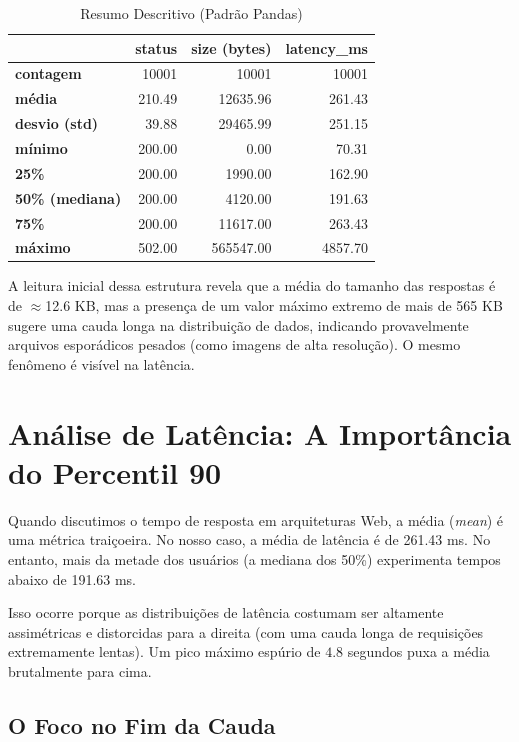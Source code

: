 \documentclass[12pt,a4paper]{report}
\begin{document}
\begin{table}[h]
\centering
\caption{Resumo Descritivo (Padrão Pandas)}
\begin{tabular}{lrrr}
\toprule
 & \textbf{status} & \textbf{size (bytes)} & \textbf{latency\_ms} \\
\midrule
\textbf{contagem} & 10001 & 10001 & 10001 \\
\textbf{média} & 210.49 & 12635.96 & 261.43 \\
\textbf{desvio (std)} & 39.88 & 29465.99 & 251.15 \\
\textbf{mínimo} & 200.00 & 0.00 & 70.31 \\
\textbf{25\%} & 200.00 & 1990.00 & 162.90 \\
\textbf{50\% (mediana)} & 200.00 & 4120.00 & 191.63 \\
\textbf{75\%} & 200.00 & 11617.00 & 263.43 \\
\textbf{máximo} & 502.00 & 565547.00 & 4857.70 \\
\bottomrule
\end{tabular}
\end{table}

A leitura inicial dessa estrutura revela que a média do tamanho das respostas é de $\approx$12.6 KB, mas a presença de um valor máximo extremo de mais de 565 KB sugere uma cauda longa na distribuição de dados, indicando provavelmente arquivos esporádicos pesados (como imagens de alta resolução). O mesmo fenômeno é visível na latência.

\section{Análise de Latência: A Importância do Percentil 90}

Quando discutimos o tempo de resposta em arquiteturas Web, a média (\textit{mean}) é uma métrica traiçoeira. No nosso caso, a média de latência é de 261.43 ms. No entanto, mais da metade dos usuários (a mediana dos 50\%) experimenta tempos abaixo de 191.63 ms. 

Isso ocorre porque as distribuições de latência costumam ser altamente assimétricas e distorcidas para a direita (com uma cauda longa de requisições extremamente lentas). Um pico máximo espúrio de $4.8$ segundos puxa a média brutalmente para cima.

\subsection{O Foco no Fim da Cauda}
\end{document}
